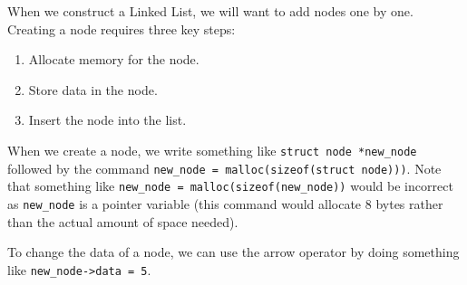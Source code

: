 When we construct a Linked List, we will want to add nodes one by one. Creating a node requires three key steps: \begin{enumerate}
    \item Allocate memory for the node.
    \item Store data in the node.
    \item Insert the node into the list.
\end{enumerate}

When we create a node, we write something like \verb!struct node *new_node! followed by the command \verb!new_node = malloc(sizeof(struct node)))!. Note that something like \verb!new_node = malloc(sizeof(new_node))! would be incorrect as \verb!new_node! is a pointer variable (this command would allocate $8$ bytes rather than the actual amount of space needed). 

To change the data of a node, we can use the arrow operator by doing something like \verb!new_node->data = 5!. 
